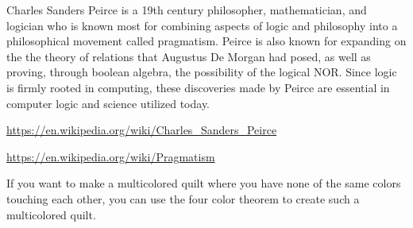 \documentclass{article}
\begin{document}
\clearpage
\header
\item[]Charles Sanders Peirce is a 19th century philosopher, mathematician, and logician who is known most for combining aspects of logic and philosophy into a philosophical movement called pragmatism. Peirce is also known for expanding on the the theory of relations that Augustus De Morgan had posed, as well as proving, through boolean algebra, the possibility of the logical NOR. Since logic is firmly rooted in computing, these discoveries made by Peirce are essential in computer logic and science utilized today.
\item[]\url{https://en.wikipedia.org/wiki/Charles_Sanders_Peirce}
\item[]\url{https://en.wikipedia.org/wiki/Pragmatism}


\clearpage
\header
\item[]If you want to make a multicolored quilt where you have none of the same colors touching each other, you can use the four color theorem to create such a multicolored quilt.
\end{document}
